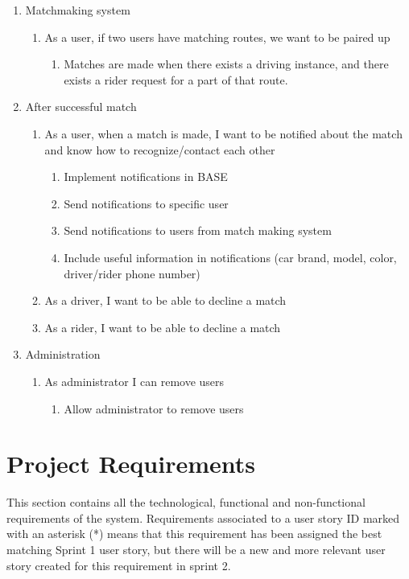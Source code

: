 \documentclass{article}
\begin{document}
\begin{enumerate}
  \item Matchmaking system
  \begin{enumerate}
      \item As a user, if two users have matching routes, we want to be paired up
      \begin{enumerate}
          \item Matches are made when there exists a driving instance, and there exists a rider request for a part of that route.
      \end{enumerate}
  \end{enumerate}
  
  \item After successful match
  \begin{enumerate}
      \item As a user, when a match is made, I want to be notified about the match and know how to recognize/contact each other
      \begin{enumerate}
          \item Implement notifications in BASE
          \item Send notifications to specific user
          \item Send notifications to users from match making system
          \item Include useful information in notifications (car brand, model, color, driver/rider phone number)
      \end{enumerate}
      \item As a driver, I want to be able to decline a match
      \item As a rider, I want to be able to decline a match
  \end{enumerate}
  
  \item Administration
  \begin{enumerate}
      \item As administrator I can remove users
      \begin{enumerate}
          \item Allow administrator to remove users
      \end{enumerate}
  \end{enumerate}
  
\end{enumerate}

\newpage
\section{Project Requirements}
This section contains all the technological,  functional and non-functional requirements of the system. Requirements associated to a user story ID marked with an asterisk (*) means that this requirement has been assigned the best matching Sprint 1 user story, but there will be a new and more relevant user story created for this requirement in sprint 2.
\end{document}

